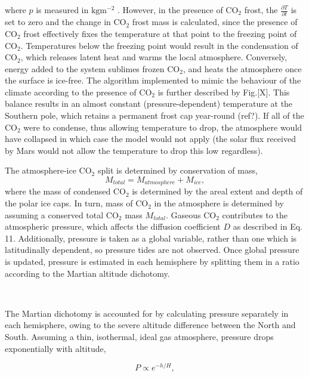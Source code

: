 \documentclass[12pt,onecolumn]{revtex4-2}    %
\begin{document}
where $p$ is measured in $\mathrm{kg m^{-2}}$ \cite{H54}. However, in the presence of $\mathrm{CO_2}$ frost, the $\frac{\partial T}{\partial t}$ is set to zero and the change in $\mathrm{CO_2}$ frost mass is calculated, since the presence of  $\mathrm{CO_2}$ frost effectively fixes the temperature at that point to the freezing point of $\mathrm{CO_2}$. Temperatures below the freezing point would result in the condensation of $\mathrm{CO_2}$, which releases latent heat and warms the local atmosphere. Conversely, energy added to the system sublimes frozen $\mathrm{CO_2}$, and heats the atmosphere once the surface is ice-free. The algorithm implemented to mimic the behaviour of the climate according to the presence of $\mathrm{CO_2}$ is further described by Fig.[X]. This balance results in an almost constant (pressure-dependent) temperature at the Southern pole, which retains a permanent frost cap year-round (ref?).  If all of the $\mathrm{CO_2}$ were to condense, thus allowing temperature to drop, the atmosphere would have collapsed in which case the model would not apply (the solar flux received by Mars would not allow the temperature to drop this low regardless).
\

The atmosphere-ice $\mathrm{CO_2}$ split is determined by conservation of mass, 
\begin{equation}
M_{total} = M_{atmosphere} + M_{ice},
\end{equation}
where the mass of condensed $\mathrm{CO_2}$ is determined by the areal extent and depth of the polar ice caps. In turn, mass of $\mathrm{CO_2}$ in the atmosphere is determined by assuming a conserved total $\mathrm{CO_2}$ mass $M_{total}$. Gaseous $\mathrm{CO_2}$ contributes to the atmospheric pressure, which affects the diffusion coefficient $D$ as described in Eq. 11. Additionally, pressure is taken as a global variable, rather than one which is latitudinally dependent, so pressure tides are not observed. Once global pressure is updated, pressure is estimated in each hemisphere by splitting them in a ratio according to the Martian altitude dichotomy. 

\

The Martian dichotomy is accounted for by calculating pressure separately in each hemisphere, owing to the severe altitude difference between the North and South. Assuming a thin, isothermal, ideal gas atmosphere, pressure drops exponentially with altitude,

\begin{equation}
P \propto e^{-h/H},
\end{equation}
\end{document}
